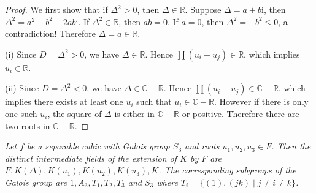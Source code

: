 \begin{proof}
We first show that if $\Delta^2>0$, then $\Delta\in\mathbb{R}$. Suppose $\Delta=a+b\mathrm{i}$, then $\Delta^2=a^2-b^2+2ab\mathrm{i}$. If $\Delta^2\in\mathbb{R}$, then $ab=0$. If $a=0$, then $\Delta^2=-b^2\le 0$, a contradiction! Therefore $\Delta=a\in\mathbb{R}$.\par
(i) Since $D=\Delta^2>0$, we have $\Delta\in\mathbb{R}$. Hence $\prod(u_i-u_j)\in\mathbb{R}$, which implies $u_i\in\mathbb{R}$.\par
(ii) Since $D=\Delta^2<0$, we have $\Delta\in\mathbb{C}-\mathbb{R}$. Hence $\prod(u_i-u_j)\in\mathbb{C}-\mathbb{R}$, which implies there exists at least one $u_i$ such that $u_i\in\mathbb{C}-\mathbb{R}$. However if there is only one such $u_i$, the square of $\Delta$ is either in $\mathbb{C}-\mathbb{R}$ or positive. Therefore there are two roots in $\mathbb{C}-\mathbb{R}$.
\end{proof}
\begin{problem}\em
Let $f$ be a separable cubic with Galois group $S_3$ and roots $u_1, u_2, u_3\in F$. Then the distinct intermediate fields of the extension of $K$ by $F$ are $F, K(\Delta), K(u_1), K(u_2), K(u_3), K$. The corresponding subgroups of the Galois group are $1, A_3, T_1, T_2, T_3$ and $S_3$ where $T_i=\{(1), (jk)\mid j\neq i\neq k\}$.
\end{problem}
